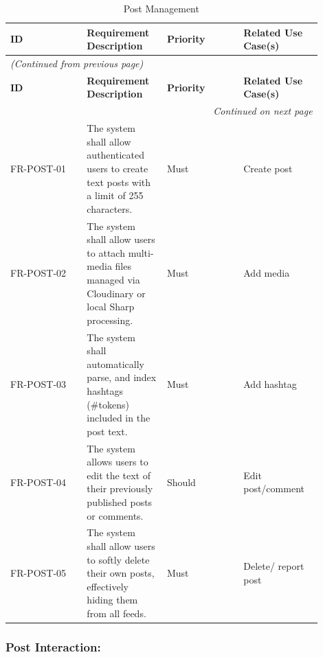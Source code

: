 \begin{longtable}{|p{0.225\linewidth}|p{0.225\linewidth}|p{0.225\linewidth}|p{0.225\linewidth}|}
\caption{Post Management} \label{tab:7} \\
\hline
\textbf{ID} & \textbf{Requirement Description} & \textbf{Priority} & \textbf{Related Use Case(s)} \\
\hline
\endfirsthead
\multicolumn{4}{l}{\textit{(Continued from previous page)}} \\
\hline
\textbf{ID} & \textbf{Requirement Description} & \textbf{Priority} & \textbf{Related Use Case(s)} \\
\hline
\endhead
\hline \multicolumn{4}{r}{\textit{Continued on next page}} \\
\endfoot
\hline
\endlastfoot
FR-POST-01 & The system shall allow authenticated users to create text posts with a limit of 255 characters. & Must & Create post \\
\hline
FR-POST-02 & The system shall allow users to attach multi-media files managed via Cloudinary or local Sharp processing. & Must & Add media \\
\hline
FR-POST-03 & The system shall automatically parse, and index hashtags (\#tokens) included in the post text. & Must & Add hashtag \\
\hline
FR-POST-04 & The system allows users to edit the text of their previously published posts or comments. & Should & Edit post/comment \\
\hline
FR-POST-05 & The system shall allow users to softly delete their own posts, effectively hiding them from all feeds. & Must & Delete/ report post \\
\hline
\end{longtable}


\subsubsection{Post Interaction:}

